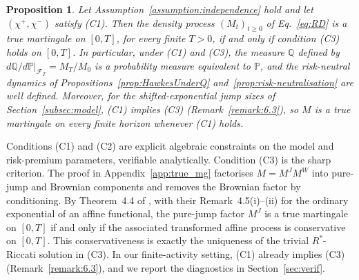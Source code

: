 \documentclass[11pt,a4paper]{article}
\numberwithin{equation}{section}
\newtheorem{proposition}[theorem]{Proposition}
\theoremstyle{remark}
\theoremstyle{definition}
\newcommand{\p}{{\mathbb P}}
\newcommand{\q}{{\mathbb Q}}
\newcommand{\Fc}{\mathcal{F}}
\begin{document}
{\begin{proposition}
  \label{prop:true_mg}
  Let Assumption~\ref{assumption:independence} hold and let $(\chi^{+},\chi^{-})$ satisfy \textup{(C1)}. Then the density process $(M_t)_{t\ge0}$ of Eq.~\eqref{eq:RD} is a true martingale on $[0,T]$, for every finite $T>0$, if and only if condition \textup{(C3)} holds on $[0,T]$. In particular, under \textup{(C1)} and \textup{(C3)}, the measure $\q$ defined by $d\q/d\p|_{\Fc_T}=M_T/M_0$ is a probability measure equivalent to $\p$, and the risk-neutral dynamics of Propositions~\ref{prop:HawkesUnderQ} and~\ref{prop:risk-neutralisation} are well defined. Moreover, for the shifted-exponential jump sizes of Section~\ref{subsec:model}, \textup{(C1)} implies \textup{(C3)} (Remark~\ref{remark:6.3}), so $M$ is a true martingale on every finite horizon whenever \textup{(C1)} holds.
\end{proposition}

Conditions (C1) and (C2) are explicit algebraic constraints on the model and risk-premium parameters, verifiable analytically. Condition (C3) is the sharp criterion. The proof in Appendix~\ref{app:true_mg} factorises $M=M^{J}M^{W}$ into pure-jump and Brownian components and removes the Brownian factor by conditioning. By Theorem~4.4 of \cite{Mayerhofer2011}, with their Remark~4.5(i)--(ii) for the ordinary exponential of an affine functional, the pure-jump factor $M^{J}$ is a true martingale on $[0,T]$ if and only if the associated transformed affine process is conservative on $[0,T]$. This conservativeness is exactly the uniqueness of the trivial $R^{*}$-Riccati solution in (C3). In our finite-activity setting, (C1) already implies (C3) (Remark~\ref{remark:6.3}), and we report the diagnostics in Section~\ref{sec:verif}.
}
\end{document}
